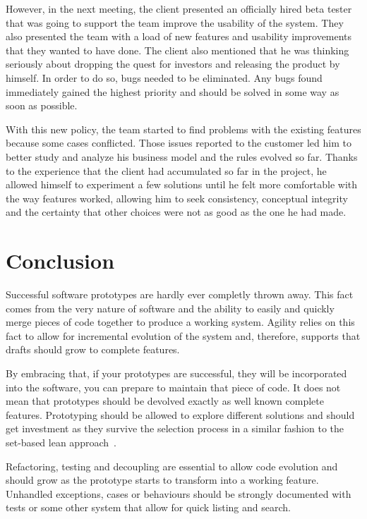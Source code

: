 \documentclass[lnbip]{svmultln}
\begin{document}
However, in the next meeting, the client presented an officially hired
beta tester that was going to support the team improve the usability
of the system. They also presented the team with a load of new
features and usability improvements that they wanted to have done. The
client also mentioned that he was thinking seriously about dropping
the quest for investors and releasing the product by himself. In order
to do so, bugs needed to be eliminated. Any bugs found immediately
gained the highest priority and should be solved in some way as soon
as possible.

With this new policy, the team started to find problems with the
existing features because some cases conflicted. Those issues reported
to the customer led him to better study and analyze his business model
and the rules evolved so far. Thanks to the experience that the client
had accumulated so far in the project, he allowed himself to
experiment a few solutions until he felt more comfortable with the way
features worked, allowing him to seek consistency, conceptual
integrity and the certainty that other choices were not as good as the
one he had made.

\section{Conclusion}
\label{sec:conclusion}

Successful software prototypes are hardly ever completly thrown
away. This fact comes from the very nature of software and the ability
to easily and quickly merge pieces of code together to produce a
working system. Agility relies on this fact to allow for incremental
evolution of the system and, therefore, supports that drafts should
grow to complete features.

By embracing that, if your prototypes are successful, they will be
incorporated into the software, you can prepare to maintain that piece
of code. It does not mean that prototypes should be devolved exactly
as well known complete features. Prototyping should be allowed to
explore different solutions and should get investment as they survive
the selection process in a similar fashion to the set-based lean
approach~\cite{Poppendieck2009}.

Refactoring, testing and decoupling are essential to allow code
evolution and should grow as the prototype starts to transform into a
working feature. Unhandled exceptions, cases or behaviours should be
strongly documented with tests or some other system that allow for
quick listing and search.
\end{document}
